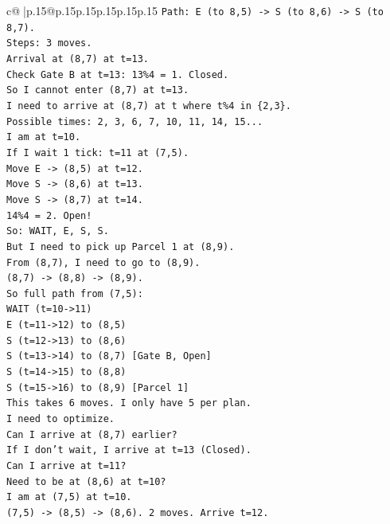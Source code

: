 \documentclass{article}
\begin{document}
{\begin{supertabular}{c@{$\;$}|p{.15\linewidth}@{}p{.15\linewidth}p{.15\linewidth}p{.15\linewidth}p{.15\linewidth}p{.15\linewidth}}
{{{\texttt{Path: E (to 8,5) {-}> S (to 8,6) {-}> S (to 8,7).} \\
\texttt{Steps: 3 moves.} \\
\texttt{Arrival at (8,7) at t=13.} \\
\texttt{Check Gate B at t=13: 13\%4 = 1. Closed.} \\
\texttt{So I cannot enter (8,7) at t=13.} \\
\texttt{I need to arrive at (8,7) at t where t\%4 in \{2,3\}.} \\
\texttt{Possible times: 2, 3, 6, 7, 10, 11, 14, 15...} \\
\texttt{I am at t=10.} \\
\texttt{If I wait 1 tick: t=11 at (7,5).} \\
\texttt{Move E {-}> (8,5) at t=12.} \\
\texttt{Move S {-}> (8,6) at t=13.} \\
\texttt{Move S {-}> (8,7) at t=14.} \\
\texttt{14\%4 = 2. Open!} \\
\texttt{So: WAIT, E, S, S.} \\
\texttt{But I need to pick up Parcel 1 at (8,9).} \\
\texttt{From (8,7), I need to go to (8,9).} \\
\texttt{(8,7) {-}> (8,8) {-}> (8,9).} \\
\texttt{So full path from (7,5):} \\
\texttt{WAIT (t=10{-}>11)} \\
\texttt{E (t=11{-}>12) to (8,5)} \\
\texttt{S (t=12{-}>13) to (8,6)} \\
\texttt{S (t=13{-}>14) to (8,7) {[}Gate B, Open{]}} \\
\texttt{S (t=14{-}>15) to (8,8)} \\
\texttt{S (t=15{-}>16) to (8,9) {[}Parcel 1{]}} \\
\texttt{This takes 6 moves. I only have 5 per plan.} \\
\texttt{I need to optimize.} \\
\texttt{Can I arrive at (8,7) earlier?} \\
\texttt{If I don't wait, I arrive at t=13 (Closed).} \\
\texttt{Can I arrive at t=11?} \\
\texttt{Need to be at (8,6) at t=10?} \\
\texttt{I am at (7,5) at t=10.} \\
\texttt{(7,5) {-}> (8,5) {-}> (8,6). 2 moves. Arrive t=12.} \\
}}}
\end{supertabular}}
\end{document}
